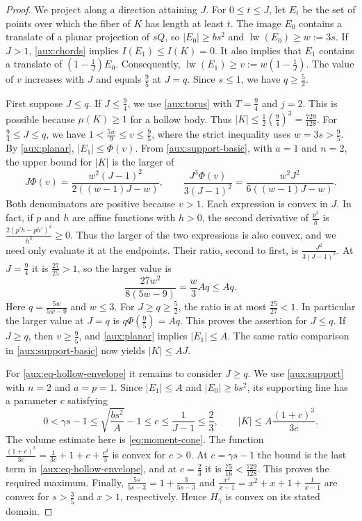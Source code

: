 \documentclass[reqno, 11pt]{article}
\numberwithin{equation}{section}
\theoremstyle{definition}
\DeclareMathOperator{\lw}{lw}
\begin{document}
\begin{proof}
We project along a direction attaining $J$. For $0\le t\le J$, let
$E_t$ be the set of points over which the fiber of $K$ has length at
least $t$. The image $E_0$ contains a translate of a planar projection
of $sQ$, so $|E_0|\ge bs^2$ and $\lw(E_0)\ge w:=3s$. If $J>1$,
\cref{aux:chords} implies $I(E_1)\le I(K)=0$. It also implies that
$E_1$ contains a translate of $\left(1-\frac{1}{J}\right)E_0$.
Consequently, $\lw(E_1)\ge v:=w\left(1-\frac{1}{J}\right)$.
The value of $v$ increases with $J$ and equals $\frac{9}{5}$ at $J=q$.
Since $s\le1$, we have $q\ge\frac{5}{2}$.

First suppose $J\le q$. If $J\le\frac{9}{4}$, we use
\cref{aux:torus} with $T=\frac{9}{4}$ and $j=2$. This is possible
because $\mu(K)\ge1$ for a hollow body. Thus
$|K|\le\frac{1}{2}\left(\frac{9}{4}\right)^3=\frac{729}{128}$.
For $\frac{9}{4}\le J\le q$, we have
$1<\frac{5w}{9}\le v\le\frac{9}{5}$, where the strict inequality
uses $w=3s>\frac{9}{5}$. By \cref{aux:planar},
$|E_1|\le\Phi(v)$. From \eqref{aux:support-basic}, with $a=1$
and $n=2$, the upper bound for $|K|$ is the larger of
\[
  J\Phi(v)=\frac{w^2(J-1)^2}{2((w-1)J-w)},\qquad
  \frac{J^3\Phi(v)}{3(J-1)^2}
        =\frac{w^2J^2}{6((w-1)J-w)}.
\]
Both denominators are positive because $v>1$. Each expression is
convex in $J$. In fact, if $p$ and $h$ are affine functions with
$h>0$, the second derivative of $\frac{p^2}{h}$ is
$\frac{2(p'h-ph')^2}{h^3}\ge0$. Thus the larger of the two
expressions is also convex, and we need only evaluate it at the
endpoints. Their ratio, second to first, is $\frac{J^2}{3(J-1)^2}$.
At $J=\frac{9}{4}$ it is $\frac{27}{25}>1$, so the larger value is
\[
       \frac{27w^2}{8(5w-9)}=\frac{w}{3}Aq\le Aq .
\]
Here $q=\frac{5w}{5w-9}$ and $w\le3$. For $J\ge q\ge\frac{5}{2}$,
the ratio is at most $\frac{25}{27}<1$. In particular the larger value
at $J=q$ is $q\Phi(\frac{9}{5})=Aq$. This proves the assertion for
$J\le q$. If $J\ge q$, then $v\ge\frac{9}{5}$, and \cref{aux:planar}
implies $|E_1|\le A$. The same ratio comparison in
\eqref{aux:support-basic} now yields $|K|\le AJ$.

For \eqref{aux:eq-hollow-envelope} it remains to consider $J\ge q$.
We use \cref{aux:support} with $n=2$ and $a=p=1$. Since
$|E_1|\le A$ and $|E_0|\ge bs^2$, its supporting line has a
parameter $c$ satisfying
\[
 0<\gamma s-1\le\sqrt{\frac{bs^2}{A}}-1
 \le c\le\frac{1}{J-1}\le\frac{2}{3},\qquad
 |K|\le A\frac{(1+c)^3}{3c}.
\]
The volume estimate here is \eqref{eq:moment-cone}. The function
$\frac{(1+c)^3}{3c}=\frac{1}{3c}+1+c+\frac{c^2}{3}$ is convex for
$c>0$. At $c=\gamma s-1$ the bound is the last term in
\eqref{aux:eq-hollow-envelope}, and at $c=\frac{2}{3}$ it is
$\frac{75}{16}<\frac{729}{128}$. This proves the required maximum.
Finally, $\frac{5s}{5s-3}=1+\frac{3}{5s-3}$ and
$\frac{x^3}{x-1}=x^2+x+1+\frac{1}{x-1}$ are convex for
$s>\frac{3}{5}$ and $x>1$, respectively. Hence $H_\gamma$ is convex
on its stated domain.
\end{proof}
\end{document}
